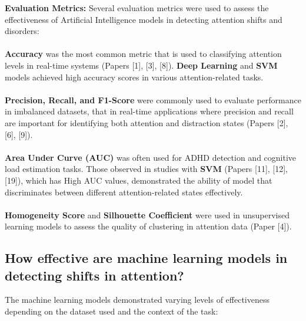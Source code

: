 \documentclass[12pt]{article}
\begin{document}
\textbf{Evaluation Metrics:} Several evaluation metrics were used to assess the effectiveness of Artificial Intelligence models in detecting attention shifts and disorders:  \\ \\
\textbullet \textbf{Accuracy} was the most common metric that is used to classifying attention levels in real-time systems (Papers [1], [3], [8]). \textbf{Deep Learning} and \textbf{SVM} models achieved high accuracy scores in various attention-related tasks.  \\ \\
\textbullet \textbf{Precision, Recall, and F1-Score} were commonly used to evaluate performance in imbalanced datasets, that in real-time applications where precision and recall are important for identifying both attention and distraction states (Papers [2], [6], [9]).  \\ \\
\textbullet \textbf{Area Under Curve (AUC)} was often used for ADHD detection and cognitive load estimation tasks. Those observed in studies with \textbf{SVM} (Papers [11], [12], [19]), which has High AUC values, demonstrated the ability of model that discriminates between different attention-related states effectively.  \\ \\
\textbullet \textbf{Homogeneity Score} and \textbf{Silhouette Coefficient} were used in unsupervised learning models to assess the quality of clustering in attention data (Paper [4]).  \\ 

\subsection{How effective are machine learning models in detecting shifts in attention?} 
The machine learning models demonstrated varying levels of effectiveness depending on the dataset used and the context of the task: \\ 
\end{document}
